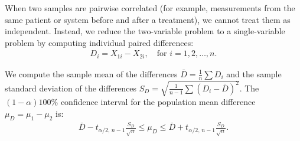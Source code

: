 \begin{definicion}
	When two samples are pairwise correlated (for example, measurements from the same patient or system before and after a treatment), we cannot treat them as independent. Instead, we reduce the two-variable problem to a single-variable problem by computing individual paired differences:
	\begin{align}
		D_i = X_{1i} - X_{2i}, \quad \text{for } i = 1, 2, \ldots, n.
	\end{align}
	
	We compute the sample mean of the differences $\bar{D} = \frac{1}{n}\sum D_i$ and the sample standard deviation of the differences $S_D = \sqrt{\frac{1}{n-1}\sum (D_i - \bar{D})^2}$. The $(1-\alpha)100\%$ confidence interval for the population mean difference $\mu_D = \mu_1 - \mu_2$ is:
	\begin{align}
		\bar{D} - t_{\alpha/2, \, n-1} \frac{S_D}{\sqrt{n}} \leq \mu_D \leq \bar{D} + t_{\alpha/2, \, n-1} \frac{S_D}{\sqrt{n}}.
	\end{align}
\end{definicion}
